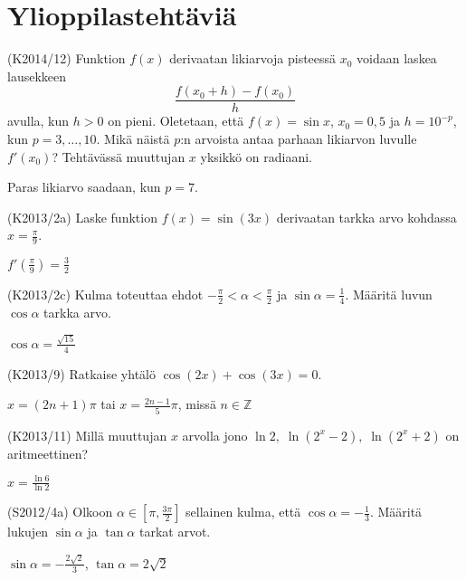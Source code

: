 \section{Ylioppilastehtäviä}

\begin{tehtava} (K2014/12)
	Funktion $f(x)$ derivaatan likiarvoja pisteessä $x_0$ voidaan laskea lausekkeen 
	\[\frac{f(x_0+h)-f(x_0)}{h}\] avulla, kun $h>0$ on pieni. Oletetaan, että $f(x)=\sin x$, 
	$x_0=0,5$ ja $h=10^{-p}$, kun $p=3,\ldots,10$. Mikä näistä $p$:n arvoista antaa parhaan 
	likiarvon luvulle $f'(x_0)$? Tehtävässä muuttujan $x$ yksikkö on radiaani.
		\begin{vastaus}
			Paras likiarvo saadaan, kun $p=7$. 
		\end{vastaus}
\end{tehtava}

\begin{tehtava} (K2013/2a)
	Laske funktion $f(x)=\sin(3x)$ derivaatan tarkka arvo kohdassa $x=\frac{\pi}{9}$.
		\begin{vastaus}
			$f'(\frac{\pi}{9})=\frac{3}{2}$
		\end{vastaus}
\end{tehtava}

\begin{tehtava} (K2013/2c)
	Kulma \alpha toteuttaa ehdot $-\frac{\pi}{2}<\alpha<\frac{\pi}{2}$ ja $\sin\alpha=\frac{1}{4}$.
	Määritä luvun $\cos\alpha$ tarkka arvo.
		\begin{vastaus}
			$\cos\alpha=\frac{\sqrt{15}}{4}$
		\end{vastaus}
\end{tehtava}

\begin{tehtava} (K2013/9)
	Ratkaise yhtälö $\cos(2x)+\cos(3x)=0$.
		\begin{vastaus}
			$x=(2n+1)\pi$ tai $x=\frac{2n-1}{5}\pi$, missä $n\in\mathbb{Z}$
		\end{vastaus}
\end{tehtava}

\begin{tehtava} (K2013/11)
	Millä muuttujan $x$ arvolla jono $\ln2, \; \ln(2^x-2), \; \ln(2^x+2)$ on aritmeettinen?
		\begin{vastaus}
			$x=\frac{\ln6}{\ln2}$
		\end{vastaus}
\end{tehtava}

\begin{tehtava} (S2012/4a)
	Olkoon $\alpha\in\left[\pi,\frac{3\pi}{2}\right]$ sellainen kulma, että $\cos\alpha=-\frac{1}{3}$.
	Määritä lukujen $\sin\alpha$ ja $\tan\alpha$ tarkat arvot.
		\begin{vastaus}
			$\sin\alpha=-\frac{2\sqrt{2}}{3}$, $\tan\alpha=2\sqrt{2}$
		\end{vastaus}
\end{tehtava}

